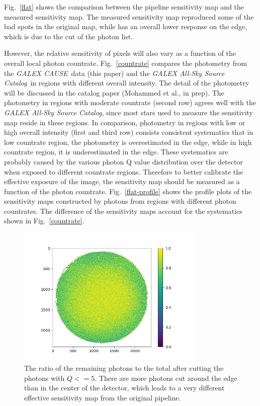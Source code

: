 \documentclass[12pt, preprint]{aastex61}
\newcommand{\project}[1]{\textsl{#1}}
\newcommand{\asc}{\project{GALEX All-Sky Source Catalog}}
\newcommand{\cause}{\project{GALEX CAUSE}}
\begin{document}
Fig.~\ref{flat} shows the comparison between the pipeline sensitivity map and the measured sensitivity map.
The measured sensitivity map reproduced some of the bad spots in the original map, while has an overall lower response on the edge, which is due to the cut of the photon list.

However, the relative sensitivity of pixels will also vary as a function of the overall local photon countrate.
Fig.~\ref{countrate} compares the photometry from the \cause\ data (this paper) and the \asc\ in regions with different overall intensity.
The detail of the photometry will be discussed in the catalog paper (Mohammed et al., in prep).
The photometry in regions with moderate countrate (second row) agrees well with the \asc, since most stars used to measure the sensitivity map reside in these regions.
In comparison, photometry in regions with low or high overall intensity (first and third row) consists consistent systematics that in low countrate region, the photometry is overestimated in the edge, while in high countrate region, it is underestimated in the edge.
These systematics are probably caused by the various photon Q value distribution over the detector when exposed to different countrate regions.
Therefore to better calibrate the effective exposure of the image, the sensitivity map should be measured as a function of the photon countrate.
Fig.~\ref{flat-profile} shows the profile plots of the sensitivity maps constructed by photons from regions with different photon countrates.
The difference of the sensitivity maps account for the systematics shown in Fig.~\ref{countrate}.

\begin{figure}[p]
\begin{center}
\includegraphics[width=0.8\textwidth]{figures/q50}
\end{center}
\caption{
  \label{qcut}
  The ratio of the remaining photons to the total after cutting the photons with $Q<=5$.
  There are more photons cut around the edge than in the center of the detector, which leads to a very different effective sensitivity map from the original pipeline.
}
\end{figure}
\end{document}
